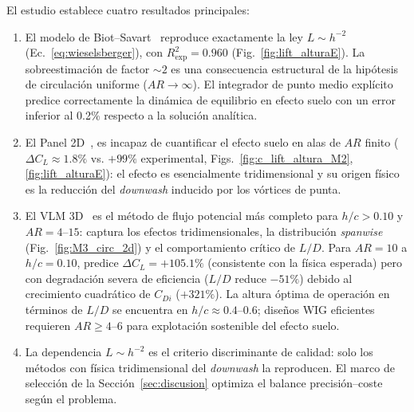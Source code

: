 \documentclass[twocolumn]{article}
\begin{document}
El estudio establece cuatro resultados principales:

\begin{enumerate}
  \item El modelo de Biot--Savart~\cite{wieselsberger1922} reproduce
    exactamente la ley $L \sim h^{-2}$ (Ec.~\eqref{eq:wieselsberger}),
    con $R^2_\text{exp} = 0.960$ (Fig.~\ref{fig:lift_alturaE}).
    La sobreestimación de factor ${\sim}2$ es una consecuencia
    estructural de la hipótesis de circulación uniforme
    ($\mathit{AR} \to \infty$). El integrador de punto medio explícito
    predice correctamente la dinámica de equilibrio en efecto suelo
    con un error inferior al 0.2\% respecto a la solución analítica.
  \item El Panel 2D~\cite{hess1967}, es incapaz de cuantificar el efecto
    suelo en alas de $\mathit{AR}$ finito ($\Delta C_L \approx 1.8\%$
    vs. $+99\%$ experimental, Figs.~\ref{fig:c_lift_altura_M2},
    \ref{fig:lift_alturaE}): el efecto es esencialmente tridimensional
    y su origen físico es la reducción del \textit{downwash} inducido
    por los vórtices de punta.
 \item El VLM 3D~\cite{katz2001} es el método de flujo potencial más
    completo para $h/c > 0.10$ y $\mathit{AR} = 4$--$15$: captura
    los efectos tridimensionales, la distribución \textit{spanwise} 
    (Fig.~\ref{fig:M3_circ_2d}) y el comportamiento crítico de $L/D$. 
    Para $\mathit{AR} = 10$ a $h/c = 0.10$, predice $\Delta C_L = +105.1\%$ 
    (consistente con la física esperada) pero con degradación severa de 
    eficiencia ($L/D$ reduce $-51\%$) debido al crecimiento cuadrático de 
    $C_{Di}$ ($+321\%$). La altura óptima de operación en términos de $L/D$ 
    se encuentra en $h/c \approx 0.4$--$0.6$; diseños WIG eficientes 
    requieren $\mathit{AR} \geq 4$--$6$ para explotación sostenible del 
    efecto suelo.
  \item La dependencia $L \sim h^{-2}$ es el criterio discriminante
    de calidad: solo los métodos con física tridimensional del
    \textit{downwash} la reproducen. El marco de selección de la
    Sección~\ref{sec:discusion} optimiza el balance
    precisión--coste según el problema.
\end{enumerate}

\printbibliography
\end{document}
